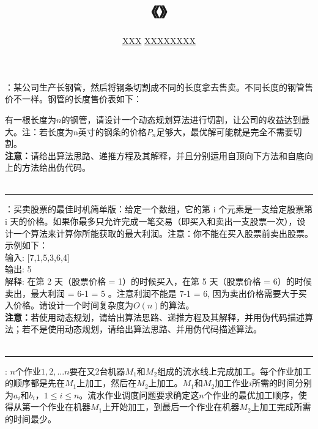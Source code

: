 \documentclass[UTF8,16pt]{article} %
\title{《\heiti{算法设计与分析}》\heiti{第{\color{red}3}次作业}}
\author{\kaishu{姓名：}\underline{XXX} \quad\quad\quad\quad\quad  \kaishu{学号：}\underline{XXXXXXXX}}
\date{}
\begin{document}
	
\maketitle
\vbox{} %


：某公司生产长钢管，然后将钢条切割成不同的长度拿去售卖。不同长度的钢管售价不一样。钢管的长度售价表如下：
\begin{table}[htb]
	\caption{钢管售价表}
	\label{tab:my-table}
\end{table}

\noindent
有一根长度为$n$的钢管，请设计一个动态规划算法进行切割，让公司的收益达到最大。注：若长度为n英寸的钢条的价格$P_{n}$足够大，最优解可能就是完全不需要切割。\\
\textbf{注意：}请给出算法思路、递推方程及其解释，并且分别运用自顶向下方法和自底向上的方法给出伪代码。\\
{}\\
\rule[0pt]{14.3cm}{0.05em}



\vbox{} %
：买卖股票的最佳时机简单版：给定一个数组，它的第 i 个元素是一支给定股票第 i 天的价格。如果你最多只允许完成一笔交易（即买入和卖出一支股票一次），设计一个算法来计算你所能获取的最大利润。注意：你不能在买入股票前卖出股票。示例如下：\\
输入: [7,1,5,3,6,4] \\
输出: 5 \\
解释: 在第 2 天（股票价格 = 1）的时候买入，在第 5 天（股票价格 = 6）的时候卖出，最大利润 = 6-1 = 5 。注意利润不能是 7-1 = 6, 因为卖出价格需要大于买入价格。请设计一个时间复杂度为$O(n)$的算法。\\
\textbf{注意：}若使用动态规划，请给出算法思路、递推方程及其解释，并用伪代码描述算法；若不是使用动态规划，请给出算法思路、并用伪代码描述算法。\\
{}\\
\rule[0pt]{14.3cm}{0.05em}


\vbox{} %
: $n$个作业${1,2,...n}$要在又2台机器$M_1$和$M_2$组成的流水线上完成加工。每个作业加工的顺序都是先在$M_1$上加工，然后在$M_2$上加工。$M_1$和$M_2$加工作业$i$所需的时间分别为$a_i$和$b_i$，$1\leq  i\leq n$。流水作业调度问题要求确定这$n$个作业的最优加工顺序，使得从第一个作业在机器$M_1$上开始加工，到最后一个作业在机器$M_2$上加工完成所需的时间最少。
\end{document}
